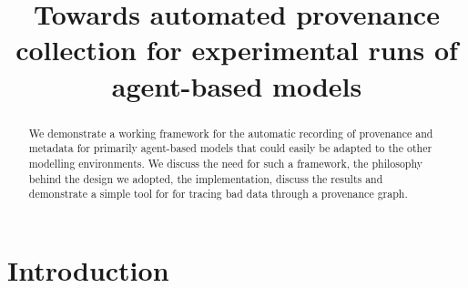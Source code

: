 \documentclass[runningheads]{llncs}
\begin{document}
%
\title{Towards automated provenance collection for experimental runs of agent-based models}

%
%

%
%
%
\maketitle              %
%
\begin{abstract}
    We demonstrate a working framework for the automatic recording of
    provenance and metadata for primarily agent-based models that could easily
    be adapted to the other modelling environments. We discuss the need for
    such a framework, the philosophy behind the design we adopted, the
    implementation, discuss the results and demonstrate a simple tool for for
    tracing bad data through a provenance graph.

\end{abstract}
%
%
%
\section{Introduction}
\end{document}

